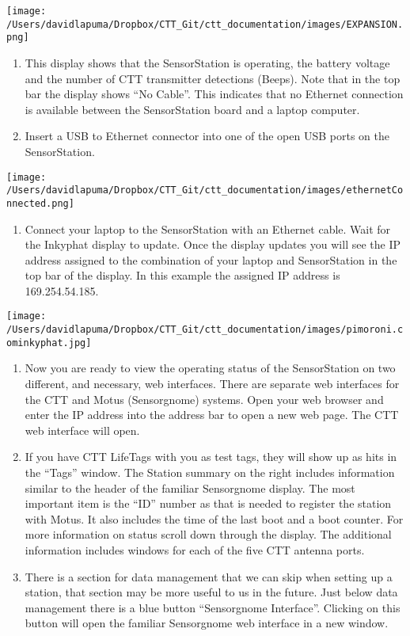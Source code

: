 \documentclass[
]{article}
\providecommand{\tightlist}{%
  \setlength{\itemsep}{0pt}\setlength{\parskip}{0pt}}
\begin{document}
\texttt{[image: /Users/davidlapuma/Dropbox/CTT\_Git/ctt\_documentation/images/EXPANSION.png]}

\begin{enumerate}
\def\labelenumi{\arabic{enumi}.}
\setcounter{enumi}{5}
\tightlist
\item
  This display shows that the SensorStation is operating, the battery
  voltage and the number of CTT transmitter detections (Beeps). Note
  that in the top bar the display shows ``No Cable''. This indicates
  that no Ethernet connection is available between the SensorStation
  board and a laptop computer.
\item
  Insert a USB to Ethernet connector into one of the open USB ports on
  the SensorStation.
\end{enumerate}

\texttt{[image: /Users/davidlapuma/Dropbox/CTT\_Git/ctt\_documentation/images/ethernetConnected.png]}

\begin{enumerate}
\def\labelenumi{\arabic{enumi}.}
\setcounter{enumi}{7}
\tightlist
\item
  Connect your laptop to the SensorStation with an Ethernet cable. Wait
  for the Inkyphat display to update. Once the display updates you will
  see the IP address assigned to the combination of your laptop and
  SensorStation in the top bar of the display. In this example the
  assigned IP address is 169.254.54.185.
\end{enumerate}

\texttt{[image: /Users/davidlapuma/Dropbox/CTT\_Git/ctt\_documentation/images/pimoroni.cominkyphat.jpg]}

\begin{enumerate}
\def\labelenumi{\arabic{enumi}.}
\setcounter{enumi}{8}
\item
  Now you are ready to view the operating status of the SensorStation on
  two different, and necessary, web interfaces. There are separate web
  interfaces for the CTT and Motus (Sensorgnome) systems. Open your web
  browser and enter the IP address into the address bar to open a new
  web page. The CTT web interface will open.
\item
  If you have CTT LifeTags with you as test tags, they will show up as
  hits in the ``Tags'' window. The Station summary on the right includes
  information similar to the header of the familiar Sensorgnome display.
  The most important item is the ``ID'' number as that is needed to
  register the station with Motus. It also includes the time of the last
  boot and a boot counter. For more information on status scroll down
  through the display. The additional information includes windows for
  each of the five CTT antenna ports.
\item
  There is a section for data management that we can skip when setting
  up a station, that section may be more useful to us in the future.
  Just below data management there is a blue button ``Sensorgnome
  Interface''. Clicking on this button will open the familiar
  Sensorgnome web interface in a new window.
\end{enumerate}
\end{document}
